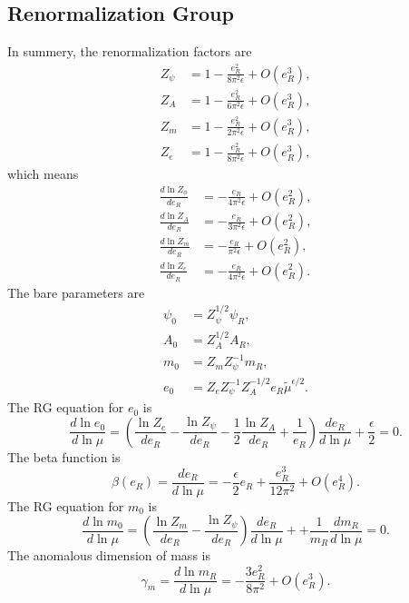 \documentclass[aps,prb,superscriptaddress,nofootinbib]{revtex4}
\begin{document}
\subsection{Renormalization Group}
In summery, the renormalization factors are
\begin{equation}
\begin{aligned}
	Z_\psi &= 1 -\frac{e_R^2}{8\pi^2\epsilon} + O(e_R^3), \\
	Z_A &= 1 - \frac{e_R^2}{6\pi^2 \epsilon} + O(e_R^3), \\
	Z_m &= 1 - \frac{e_R^2}{2\pi^2\epsilon} + O(e_R^3), \\
	Z_e &= 1 - \frac{e_R^2}{8\pi^2\epsilon} + O(e_R^3),
\end{aligned}
\end{equation}
which means
\begin{equation}
\begin{aligned}
	\frac{d\ln Z_\phi}{d e_R} &= -\frac{e_R}{4\pi^2 \epsilon} + O(e_R^2), \\
	\frac{d\ln Z_A}{d e_R} &= -\frac{e_R}{3\pi^2 \epsilon} + O(e_R^2), \\
	\frac{d\ln Z_m}{d e_R} &= -\frac{e_R}{\pi^2 \epsilon} + O(e_R^2), \\
	\frac{d\ln Z_e}{d e_R} &= -\frac{e_R}{4\pi^2 \epsilon} + O(e_R^2).
\end{aligned}
\end{equation}
The bare parameters are
\begin{equation}
\begin{aligned}
	\psi_0 &= Z_\psi^{1/2}\psi_R, \\
	A_0 &= Z_A^{1/2} A_R, \\
	m_0 &= Z_m Z_\psi^{-1} m_R, \\
	e_0 &= Z_e Z_\psi^{-1} Z_A^{-1/2} e_R \tilde{\mu}^{\epsilon/2}. 
\end{aligned}
\end{equation}
The RG equation for $e_0$ is
\begin{equation}
	\frac{d\ln e_0}{d\ln \mu}
	= \left(\frac{\ln Z_e}{d e_R} - \frac{\ln Z_\psi}{d e_R} - \frac{1}{2} \frac{\ln Z_A}{d e_R} + \frac{1}{e_R} \right)\frac{de_R}{d\ln \mu} + \frac{\epsilon}{2} = 0.
\end{equation}
The beta function is
\begin{equation}
	\beta(e_R) = \frac{de_R}{d\ln \mu} = -\frac{\epsilon}{2}e_R + \frac{e_R^3}{12\pi^2} + O(e_R^4).
\end{equation}
The RG equation for $m_0$ is
\begin{equation}
	\frac{d\ln m_0}{d\ln \mu}
	= \left(\frac{\ln Z_m}{d e_R} - \frac{\ln Z_\psi}{d e_R}\right)\frac{de_R}{d\ln \mu} + + \frac{1}{m_R}\frac{d m_R}{d\ln\mu} = 0.
\end{equation}
The anomalous dimension of mass is
\begin{equation}
	\gamma_m = \frac{d \ln m_R}{d\ln\mu} = -\frac{3e_R^2}{8\pi^2} + O(e_R^3).
\end{equation}
\end{document}
